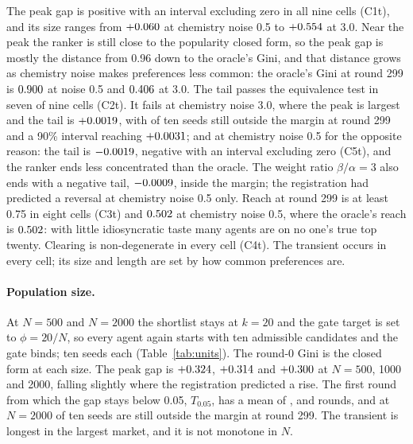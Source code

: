 The peak gap is positive with an interval excluding zero in all nine cells
(C1t), and its size ranges from $+0.060$ at chemistry noise 0.5 to
$+0.554$ at 3.0. Near the peak the ranker is still close to the popularity
closed form, so the peak gap is mostly the distance from 0.96 down to the oracle's
Gini, and that distance grows as chemistry noise makes preferences less common:
the oracle's Gini at round 299 is $0.900$ at noise 0.5 and
$0.406$ at 3.0. The tail passes the equivalence test in seven of
nine cells (C2t). It fails at chemistry noise 3.0, where the peak is largest and
the tail is $+0.0019$, with \censoredShockHigh{} of ten seeds still outside
the margin at round 299 and a 90\% interval reaching $+0.0031$; and at
chemistry noise 0.5 for the opposite reason: the
tail is $-0.0019$, negative with an interval excluding zero (C5t), and the
ranker ends less concentrated than the oracle. The weight ratio $\beta/\alpha = 3$
also ends with a negative tail, $-0.0009$, inside the margin; the
registration had predicted a reversal at chemistry noise 0.5 only. Reach at round
299 is at least 0.75 in eight cells (C3t) and $0.502$ at chemistry noise
0.5, where the oracle's reach is $0.502$: with little idiosyncratic
taste many agents are on no one's true top twenty. Clearing is non-degenerate
in every cell (C4t). The transient occurs in every cell; its size and length are
set by how common preferences are.

\paragraph{Population size.} At $N = 500$ and $N = 2000$ the shortlist stays at
$k = 20$ and the gate target is set to $\phi = 20/N$, so every agent again starts
with ten admissible candidates and the gate binds; ten seeds each
(Table~\ref{tab:units}). The round-0 Gini is the closed form at each size. The
peak gap is $+0.324$, $+0.314$ and $+0.300$ at $N = 500$, 1000 and
2000, falling slightly where the registration predicted a rise. The first round
from which the gap stays below 0.05, $T_{0.05}$, has a mean of \TfiveNFive{},
\TfiveNTen{} and \TfiveNTwenty{} rounds, and at $N = 2000$ \censoredNTwenty{} of
ten seeds are still outside the margin at round 299. The transient is longest in
the largest market, and it is not monotone in $N$.

